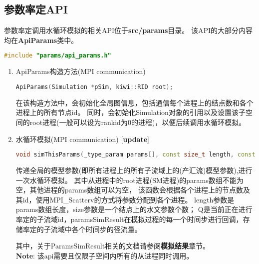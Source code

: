 \subsection{参数率定API}
参数率定调用水循环模拟的相关API位于\textbf{src/params}目录。
该API的大部分内容均在\textbf{ApiParams}类中。
\begin{lstlisting}[language=c]
#include "params/api_params.h"
\end{lstlisting}

\begin{enumerate}
  \item ApiParams构造方法(MPI communication)
\begin{lstlisting}[language=c++]
  ApiParams(Simulation *pSim, kiwi::RID root);
\end{lstlisting}
  在该构造方法中，会初始化全局图信息，包括通信每个进程上的结点数和各个进程上的所有节点id。
  同时，会初始化Simulation对象的引用以及设置该子空间的root进程(一般可以设为rankid为0的进程)，以便后续调用水循环模拟。

  \item 水循环模拟(MPI communication) {\color{cyan} [\textbf{update}] }
\begin{lstlisting}[language=c++]
  void simThisParams(_type_param params[], const size_t length, const size_t size, _type_node_id id, ParamsSimResult *paramsSimResult)
\end{lstlisting}
   传递全局的模型参数(即所有进程上的所有子流域上的(产汇流)模型参数),进行一次水循环模拟。
   其中从进程中的root进程(SM进程)的params数组不能为空，其他进程的params数组可以为空，
   该函数会根据各个进程上的节点数及其id，使用MPI\_Scatterv的方式将参数分配到各个进程。
   length参数是params数组长度，size参数是一个结点上的水文参数个数；
   Q是当前正在进行率定的子流域id，paramsSimResult在模拟过程的每一个时间步进行回调，存储率定的子流域中各个时间步的径流量。

    其中，关于ParamsSimResult相关的文档请参阅\textbf{模拟结果}章节。\\
   \textbf{Note}: 该api需要且仅限子空间内所有的从进程同时调用。
\end{enumerate}
